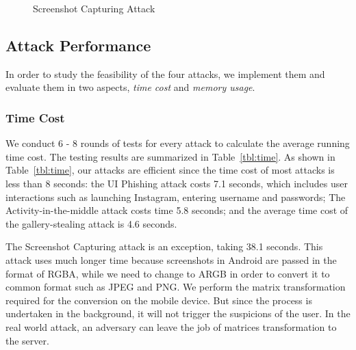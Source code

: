\documentclass[letterpaper,12pt]{article}
\begin{document}
\begin{figure}[t]
\begin{subfigure}[b]{0.31\textwidth}
                \caption{}
        \end{subfigure}
         \caption{Screenshot Capturing Attack}
         \vspace{-0.2cm}
         \label{fig:memory}
\end{figure}

\subsection{Attack Performance}\label{sec:attackperf}

In order to study the feasibility of the four attacks, we implement them and evaluate them in
two aspects, \emph{time cost} and \emph{memory usage}.

\subsubsection{Time Cost}
We conduct 6 - 8 rounds of tests for every attack to calculate the average
running time cost. The testing results are summarized
in Table~\ref{tbl:time}. As shown in Table~\ref{tbl:time}, our attacks
are efficient since the time cost of most attacks is less than 8 seconds:
the UI Phishing attack costs 7.1 seconds, which includes user
interactions such as launching Instagram, entering username and
passwords; The Activity-in-the-middle attack costs time 5.8 seconds; and
the average time cost of the gallery-stealing attack is 4.6 seconds.

The Screenshot Capturing attack is an exception, taking 38.1
seconds. This attack uses much longer time because screenshots in
Android are passed in the format of RGBA, while we need to change to
ARGB in order to convert it to common format such as JPEG and PNG.
We perform the matrix transformation required for the conversion on
the mobile device. But since the process is undertaken in the background, it will
not trigger the suspicions of the user. In the real world attack, an
adversary can leave the job of matrices transformation to the server.
\end{document}
